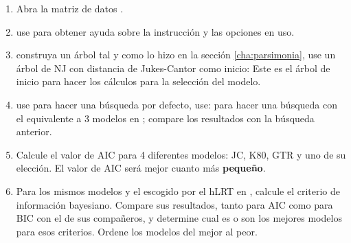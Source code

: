 \begin{enumerate}		
	\item  Abra la matriz de datos .
	\item use  para obtener ayuda sobre la instrucci\'on  y las opciones en uso.
	\item  construya un \'arbol tal y como lo hizo en la secci\'on \ref{cha:parsimonia},
	use un \'arbol de NJ con distancia de Jukes-Cantor como inicio:
	   Este es el \'arbol de inicio para hacer los c\'alculos para la selecci\'on del modelo.
	    
	\item use 
	   para hacer una b\'usqueda por defecto, use: 
	   para hacer una b\'usqueda con el equivalente a 3 modelos en ; compare los resultados con la b\'usqueda anterior.

	\item Calcule el valor de AIC para 4 diferentes modelos: JC, K80, GTR y uno de su elecci\'on. El valor de AIC ser\'a mejor cuanto m\'as \textbf{peque\~no}.

	\item Para los mismos modelos y el escogido por el hLRT en , calcule el criterio de informaci\'on bayesiano. Compare sus resultados, tanto para AIC como para BIC con el de sus compa\~neros, y determine cual es o son los mejores modelos para esos criterios. Ordene los modelos del mejor al peor. 


\end{enumerate}



